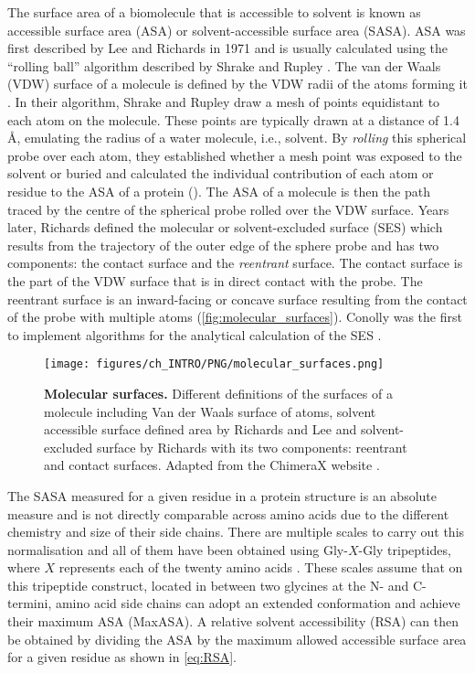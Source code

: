 The surface area of a biomolecule that is accessible to solvent is known as accessible surface area (ASA) or solvent-accessible surface area (SASA). ASA was first described by Lee and Richards in 1971 \cite{LEE_1971_ASA} and is usually calculated using the ``rolling ball'' algorithm described by Shrake and Rupley \cite{SHRAKE_1973_ASA}. The van der Waals (VDW) surface of a molecule is defined by the VDW radii of the atoms forming it \cite{1873_VANDERWAALS_VDW}. In their algorithm, Shrake and Rupley draw a mesh of points equidistant to each atom on the molecule. These points are typically drawn at a distance of 1.4 \AA{}, emulating the radius of a water molecule, i.e., solvent. By \textit{rolling} this spherical probe over each atom, they established whether a mesh point was exposed to the solvent or buried and calculated the individual contribution of each atom or residue to the ASA of a protein (). The ASA of a molecule is then the path traced by the centre of the spherical probe rolled over the VDW surface. Years later, Richards \cite{1977_RICHARDS_SSE} defined the molecular or solvent-excluded surface (SES) which results from the trajectory of the outer edge of the sphere probe and has two components: the contact surface and the \textit{reentrant} surface. The contact surface is the part of the VDW surface that is in direct contact with the probe. The reentrant surface is an inward-facing or concave surface resulting from the contact of the probe with multiple atoms (\autoref{fig:molecular_surfaces}). Conolly was the first to implement algorithms for the analytical calculation of the SES \cite{1983_CONNOLLY_SASA, 1983_CONNOLLY_SASA2}.

\begin{figure}[htb!]
    \centering
    \texttt{[image: figures/ch\_INTRO/PNG/molecular\_surfaces.png]}
    \caption[Molecular surfaces]{\textbf{Molecular surfaces.} Different definitions of the surfaces of a molecule including Van der Waals surface of atoms, solvent accessible surface defined area by Richards and Lee and solvent-excluded surface by Richards with its two components: reentrant and contact surfaces. Adapted from the ChimeraX website \cite{surface_diagram}.}
    \label{fig:molecular_surfaces}
\end{figure}

The SASA measured for a given residue in a protein structure is an absolute measure and is not directly comparable across amino acids due to the different chemistry and size of their side chains. There are multiple scales to carry out this normalisation and all of them have been obtained using Gly-$X$-Gly tripeptides, where $X$ represents each of the twenty amino acids \cite{1985_ROSE_MAXASA, MILLER_1987_MAXASA, TIEN_2013_RSA}. These scales assume that on this tripeptide construct, located in between two glycines at the N- and C-termini, amino acid side chains can adopt an extended conformation and achieve their maximum ASA (MaxASA). A relative solvent accessibility (RSA) can then be obtained by dividing the ASA by the maximum allowed accessible surface area for a given residue as shown in \autoref{eq:RSA}.

